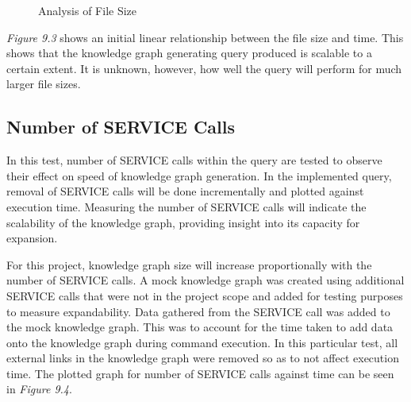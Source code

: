 \begin{figure}[H]
\begin{center}
\end{center}
\vspace{-0.75cm}
\caption{Analysis of File Size}
\end{figure}

\textit{Figure 9.3} shows an initial linear relationship between the file size and time. This shows that the knowledge graph generating query produced is scalable to a certain extent. It is unknown, however, how well the query will perform for much larger file sizes. 

\subsection{Number of SERVICE Calls}
\hspace{0.5cm} In this test, number of SERVICE calls within the query are tested to observe their effect on speed of knowledge graph generation. In the implemented query, removal of SERVICE calls will be done incrementally and plotted against execution time. Measuring the number of SERVICE calls will indicate the scalability of the knowledge graph, providing insight into its capacity for expansion.

For this project, knowledge graph size will increase proportionally with the number of SERVICE calls. A mock knowledge graph was created using additional SERVICE calls that were not in the project scope and added for testing purposes to measure expandability. Data gathered from the SERVICE call was added to the mock knowledge graph. This was to account for the time taken to add data onto the knowledge graph during command execution. In this particular test, all external links in the knowledge graph were removed so as to not affect execution time. The plotted graph for number of SERVICE calls against time can be seen in \textit{Figure 9.4}.

